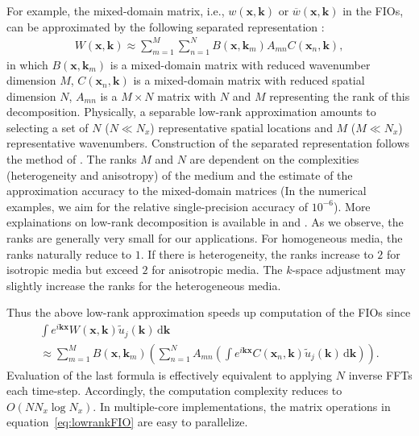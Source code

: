 For example, the mixed-domain matrix, i.e., $w(\mathbf{x},\mathbf{k})$ or
$\overline{w}(\mathbf{x},\mathbf{k})$ in
the FIOs, can be approximated by the following separated representation
\cite[]{fomel:2013}: 
\begin{equation}
	\begin{array}{lcl}
    \label{eq:lowrank}
    W(\mathbf{x},\mathbf{k})\approx
        \sum_{m=1}^M \sum_{n=1}^N B(\mathbf{x},\mathbf{k}_{m})A_{mn}C(\mathbf{x}_{n},\mathbf{k}),
\end{array}
\end{equation}
in which $B(\mathbf{x},\mathbf{k}_{m})$
is a mixed-domain matrix with reduced wavenumber dimension $M$, $C(\mathbf{x}_{n},\mathbf{k})$ is a mixed-domain
matrix with reduced spatial dimension $N$, $A_{mn}$ is a ${M}\times{N}$ matrix
with $N$ and $M$ representing the rank of this decomposition.
Physically, a separable low-rank approximation amounts to selecting
a set of $N$ ($N\ll{N_{x}}$) representative spatial locations and $M$ ($M\ll{N_{x}}$) representative wavenumbers.
Construction of the separated representation follows the method of \cite{engquist.ying:2009}.
The ranks ${M}$ and ${N}$ are dependent on the complexities (heterogeneity and anisotropy) of the medium and 
the estimate of the approximation accuracy
to the mixed-domain matrices (In the numerical examples, we aim for the relative single-precision accuracy of $10^{-6}$).
More explainations on low-rank decomposition is available in \cite{fomel:2013} and \cite{cheng.fomel:2014}.
As we observe, the ranks are generally very small for our applications.
For homogeneous media, the ranks naturally reduce to $1$. If there is heterogeneity, the ranks increase to $2$
for isotropic media but exceed $2$ for anisotropic media. The $k$-space adjustment may slightly increase the ranks for the heterogeneous media.

Thus the above low-rank approximation speeds up computation of the FIOs since
\begin{equation}
	\begin{array}{lcl}
    \label{eq:lowrankFIO}
\int{e^{i\mathbf{k}\mathbf{x}}W(\mathbf{x},\mathbf{k})\tilde{u}_{j}(\mathbf{k})}\,\mathrm{d}\mathbf{k}\\
\approx
\sum_{m=1}^M B(\mathbf{x},\mathbf{k}_{m})\left(\sum_{n=1}^NA_{mn}\left(\int{e^{i\mathbf{k}\mathbf{x}}
C(\mathbf{x}_{n},\mathbf{k})\tilde{u}_{j}(\mathbf{k})\,\mathrm{d}\mathbf{k}}\right)\right).
\end{array}
\end{equation}
Evaluation of the last formula is effectively equivalent to applying $N$ inverse FFTs
each time-step. Accordingly, the computation complexity reduces to
$O(NN_x\log{N_x})$.
In multiple-core implementations, the matrix operations in equation~\ref{eq:lowrankFIO} are easy to parallelize.

